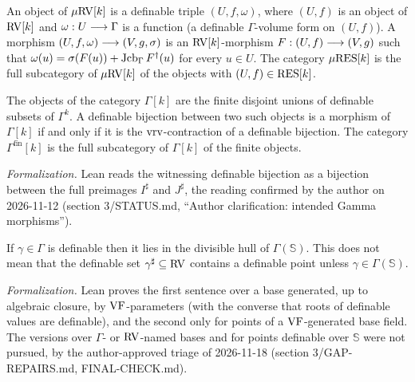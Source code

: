 \setcounter{theorem}{11}
\begin{definition}
\label{defn-RV-mu}
\leanok
{}
An object of $\mu\mathrm{RV}[k]$ is a definable triple $(U, f, \omega)$, where $(U, f)$ is an object of $\mathrm{RV}[k]$ and $\omega : U \longrightarrow \Gamma$ is a function (a definable $\Gamma$-volume form on $(U, f)$). A morphism $(U, f, \omega) \longrightarrow (V, g, \sigma)$ is an $\mathrm{RV}[k]$-morphism $F : (U, f) \longrightarrow (V, g)$ such that $\omega(u) = \sigma(F(u)) + \operatorname{Jcb}_{\Gamma} F^\dagger(u)$ for every $u \in U$. The category $\mu\mathrm{RES}[k]$ is the full subcategory of $\mu\mathrm{RV}[k]$ of the objects with $(U, f) \in \mathrm{RES}[k]$.
\end{definition}

\setcounter{theorem}{12}
\begin{definition}
\label{def-Ga-cat}
\leanok
{}
The objects of the category $\Gamma[k]$ are the finite disjoint unions of definable subsets of $\Gamma^k$. A definable bijection between two such objects is a morphism of $\Gamma[k]$ if and only if it is the $\operatorname{vrv}$-contraction of a definable bijection. The category $\Gamma^{\mathrm{fin}}[k]$ is the full subcategory of $\Gamma[k]$ of the finite objects.

\emph{Formalization.} Lean reads the witnessing definable bijection as a bijection between the full preimages $I^\sharp$ and $J^\sharp$, the reading confirmed by the author on 2026-11-12 (section 3/STATUS.md, ``Author clarification: intended Gamma morphisms'').
\end{definition}

\setcounter{theorem}{13}
\begin{remark}
\label{s3-definable-value-hull}
\leanok
{}
If $\gamma \in \Gamma$ is definable then it lies in the divisible hull of $\Gamma(\mathbb{S})$. This does not mean that the definable set $\gamma^\sharp \subseteq \mathrm{RV}$ contains a definable point unless $\gamma \in \Gamma(\mathbb{S})$.

\emph{Formalization.} Lean proves the first sentence over a base generated, up to algebraic closure, by $\mathrm{VF}$-parameters (with the converse that roots of definable values are definable), and the second only for points of a $\mathrm{VF}$-generated base field. The versions over $\Gamma$- or $\mathrm{RV}$-named bases and for points definable over $\mathbb{S}$ were not pursued, by the author-approved triage of 2026-11-18 (section 3/GAP-REPAIRS.md, FINAL-CHECK.md).
\end{remark}

